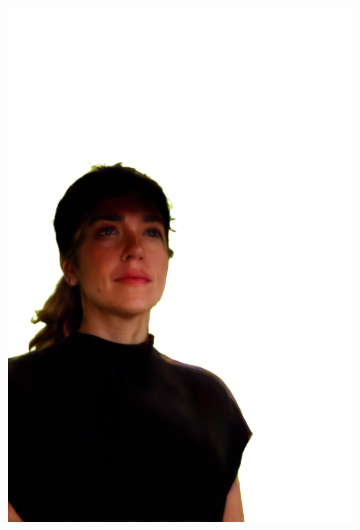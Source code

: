 \begin{figure}[ht]
\begin{subfigure}{0.08\linewidth}
        \includegraphics[width=\textwidth]{Figures/results/low/irene_cowboy/11_render.png}

\end{subfigure}
\end{figure}
